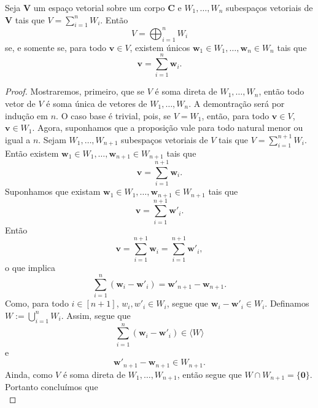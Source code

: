 \begin{proposition}
	Seja $\bm V$ um espaço vetorial sobre um corpo $\bm C$ e $W_1,\ldots,W_n$ subespaços vetoriais de $\bm V$ tais que $V = \sum_{i=1}^n W_i$. Então
	\begin{equation*}
	V=\bigoplus_{i=1}^n W_i
	\end{equation*}
se, e somente se, para todo $\bm v \in V$, existem únicos $\bm w_1 \in W_1,\ldots,\bm w_n \in W_n$ tais que
	\begin{equation*}
	\bm v = \sum_{i=1}^n \bm w_i.
	\end{equation*}
\end{proposition}
\begin{proof}
	Mostraremos, primeiro, que se $V$ é soma direta de $W_1,\ldots,W_n$, então todo vetor de $V$ é soma única de vetores de $W_1,\ldots,W_n$. A demontração será por indução em $n$. O caso base é trivial, pois, se $V=W_1$, então, para todo $\bm v \in V$, $\bm v \in W_1$. Agora, suponhamos que a proposição vale para todo natural menor ou igual a $n$. Sejam $W_1,\ldots,W_{n+1}$ subespaços vetoriais de $V$ tais que $V = \sum_{i=1}^{n+1} W_i$. Então existem $\bm w_1 \in W_1,\ldots,\bm w_{n+1} \in W_{n+1}$ tais que
	\begin{equation*}
	\bm v = \sum_{i=1}^{n+1} \bm w_i.
	\end{equation*}
Suponhamos que existam $\bm w_1 \in W_1,\ldots,\bm w_{n+1} \in W_{n+1}$ tais que
	\begin{equation*}
	\bm v = \sum_{i=1}^{n+1} \bm w'_i.
	\end{equation*}
Então
	\begin{equation*}
	\bm v = \sum_{i=1}^{n+1} \bm w_i = \sum_{i=1}^{n+1} \bm w'_i,
	\end{equation*}
o que implica
	\begin{equation*}
	\sum_{i=1}^n (\bm w_i - \bm w'_i) = \bm w'_{n+1} - \bm w_{n+1}.
	\end{equation*}
Como, para todo $i \in [n+1]$, $w_i,w'_i \in W_i$, segue que $\bm w_i - \bm w'_i \in W_i$. Definamos $W := \bigcup_{i=1}^n W_i$. Assim, segue que
	\begin{equation*}
	\sum_{i=1}^n (\bm w_i - \bm w'_i) \in \langle W \rangle
	\end{equation*}
e
	\begin{equation*}
	\bm w'_{n+1} - \bm w_{n+1} \in W_{n+1}.
	\end{equation*}
Ainda, como $V$ é soma direta de $W_1,\ldots,W_{n+1}$, então segue que $W \cap W_{n+1} = \{\bm 0\}$. Portanto concluímos que
	\begin{equation*}

\end{equation*}
\end{proof}
